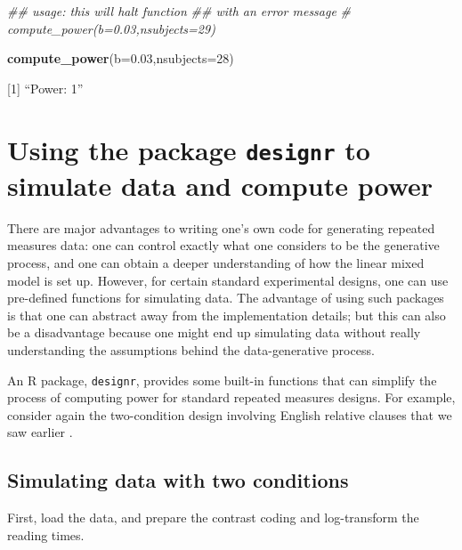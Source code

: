 \documentclass[12pt,]{krantz}
\newenvironment{Shaded}{\begin{snugshade}}{\end{snugshade}}
\newcommand{\CommentTok}[1]{\textcolor[rgb]{0.56,0.35,0.01}{\textit{#1}}}
\newcommand{\DataTypeTok}[1]{\textcolor[rgb]{0.13,0.29,0.53}{#1}}
\newcommand{\DecValTok}[1]{\textcolor[rgb]{0.00,0.00,0.81}{#1}}
\newcommand{\FloatTok}[1]{\textcolor[rgb]{0.00,0.00,0.81}{#1}}
\newcommand{\KeywordTok}[1]{\textcolor[rgb]{0.13,0.29,0.53}{\textbf{#1}}}
\newcommand{\NormalTok}[1]{#1}
\begin{document}
\begin{Shaded}
\begin{Highlighting}[]
\CommentTok{## usage: this will halt function }
\CommentTok{## with an error message}
\CommentTok{# compute_power(b=0.03,nsubjects=29)}

\KeywordTok{compute_power}\NormalTok{(}\DataTypeTok{b=}\FloatTok{0.03}\NormalTok{,}\DataTypeTok{nsubjects=}\DecValTok{28}\NormalTok{)}
\end{Highlighting}
\end{Shaded}

{[}1{]} ``Power: 1''

\hypertarget{using-the-package-designr-to-simulate-data-and-compute-power}{%
\section{\texorpdfstring{Using the package \texttt{designr} to simulate data and compute power}{Using the package designr to simulate data and compute power}}\label{using-the-package-designr-to-simulate-data-and-compute-power}}

There are major advantages to writing one's own code for generating repeated measures data: one can control exactly what one considers to be the generative process, and one can obtain a deeper understanding of how the linear mixed model is set up. However, for certain standard experimental designs, one can use pre-defined functions for simulating data. The advantage of using such packages is that one can abstract away from the implementation details; but this can also be a disadvantage because one might end up simulating data without really understanding the assumptions behind the data-generative process.

An R package, \texttt{designr}, provides some built-in functions that can simplify the process of computing power for standard repeated measures designs. For example, consider again the two-condition design involving English relative clauses that we saw earlier \citep{grodner}.

\hypertarget{simulating-data-with-two-conditions}{%
\subsection{Simulating data with two conditions}\label{simulating-data-with-two-conditions}}

First, load the data, and prepare the contrast coding and log-transform the reading times.
\end{document}
